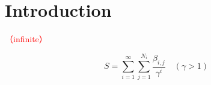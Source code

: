 \section{Introduction}\label{sec:Introduction}

\textcolor{red}{（infinite）}

\begin{equation}
  S=\sum_{i=1}^{\infty}\sum_{j=1}^{N_i}\frac{\beta_{i,j}}{\gamma^i}\quad (\gamma>1)
\end{equation}

\textcolor{red}{}
